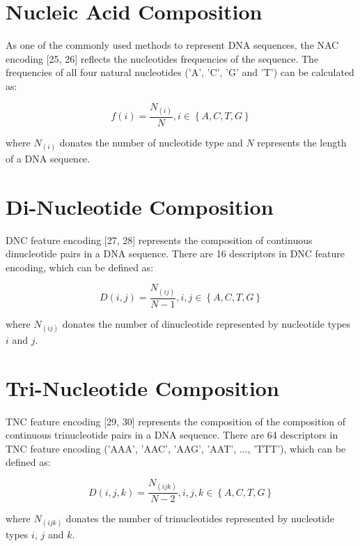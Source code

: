 \section{Nucleic Acid Composition}

As one of the commonly used methods to represent \gls{DNA} sequences, the \gls{NAC} encoding [25, 26] reflects the nucleotides frequencies of the sequence. The frequencies of all four natural nucleotides ('A', 'C', 'G' and 'T') can be calculated as:

\begin{equation}\label{eq:NAC}
    f(i) = \frac{N_{(i)}}{N}, i \in \left\{A,C,T,G\right\}
\end{equation}

where $N_{(i)}$ donates the number of nucleotide type and $N$ represents the length of a \gls{DNA} sequence.

\section{Di-Nucleotide Composition}

\gls{DNC} feature encoding [27, 28] represents the composition of continuous dinucleotide pairs in a \gls{DNA} sequence. There are 16 descriptors in \gls{DNC} feature encoding, which can be defined as:

\begin{equation}\label{eq:DNC}
    D(i,j) = \frac{N_{(ij)}}{N-1}, i,j \in \left\{A,C,T,G\right\}
\end{equation}


where $N_{(ij)}$ donates the number of dinucleotide represented by nucleotide types $i$ and $j$.

\section{Tri-Nucleotide Composition}

\gls{TNC} feature encoding [29, 30] represents the composition of the composition of continuous trinucleotide pairs in a \gls{DNA} sequence. There are 64 descriptors in \gls{TNC} feature encoding ('AAA', 'AAC', 'AAG', 'AAT', ..., 'TTT'), which can be defined as:

\begin{equation}\label{eq:TNC}
    D(i,j,k) = \frac{N_{(ijk)}}{N-2}, i,j,k \in \left\{A,C,T,G\right\}
\end{equation}

where $N_{(ijk)}$ donates the number of trinucleotides represented by nucleotide types $i$, $j$ and $k$.


